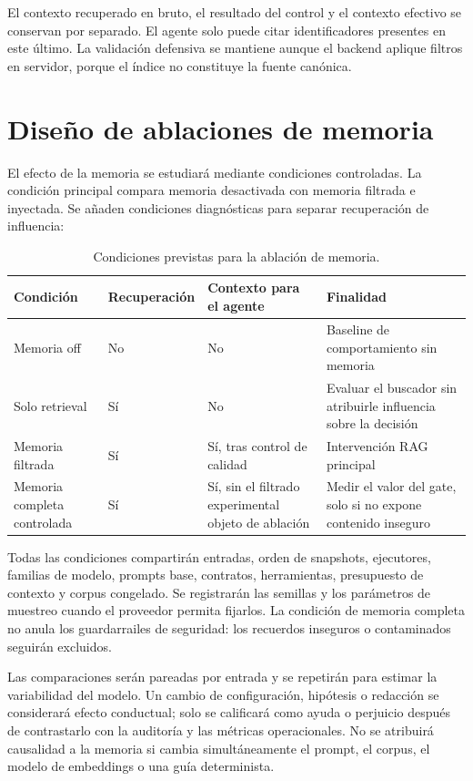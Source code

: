 El contexto recuperado en bruto, el resultado del control y el contexto efectivo
se conservan por separado. El agente solo puede citar identificadores presentes
en este último. La validación defensiva se mantiene aunque el backend aplique
filtros en servidor, porque el índice no constituye la fuente canónica.

\section{Diseño de ablaciones de memoria}

El efecto de la memoria se estudiará mediante condiciones controladas. La
condición principal compara memoria desactivada con memoria filtrada e inyectada.
Se añaden condiciones diagnósticas para separar recuperación de influencia:

\begin{table}[htbp]
\centering
\caption{Condiciones previstas para la ablación de memoria.}\label{tab:ablaciones_memoria}
\small
\begin{tabularx}{\textwidth}{>{\raggedright\arraybackslash}p{}YYY}
\toprule
Condición & Recuperación & Contexto para el agente & Finalidad \\
\midrule
Memoria off & No & No & Baseline de comportamiento sin memoria \\
Solo retrieval & Sí & No & Evaluar el buscador sin atribuirle influencia sobre la decisión \\
Memoria filtrada & Sí & Sí, tras control de calidad & Intervención RAG principal \\
Memoria completa controlada & Sí & Sí, sin el filtrado experimental objeto de ablación & Medir el valor del gate, solo si no expone contenido inseguro \\
\bottomrule
\end{tabularx}
\end{table}

Todas las condiciones compartirán entradas, orden de snapshots, ejecutores,
familias de modelo, prompts base, contratos, herramientas, presupuesto de
contexto y corpus congelado. Se registrarán las semillas y los parámetros de
muestreo cuando el proveedor permita fijarlos. La condición de memoria completa
no anula los guardarrailes de seguridad: los recuerdos inseguros o contaminados
seguirán excluidos.

Las comparaciones serán pareadas por entrada y se repetirán para estimar la
variabilidad del modelo. Un cambio de configuración, hipótesis o redacción se
considerará efecto conductual; solo se calificará como ayuda o perjuicio después
de contrastarlo con la auditoría y las métricas operacionales. No se atribuirá
causalidad a la memoria si cambia simultáneamente el prompt, el corpus, el modelo
de embeddings o una guía determinista.

